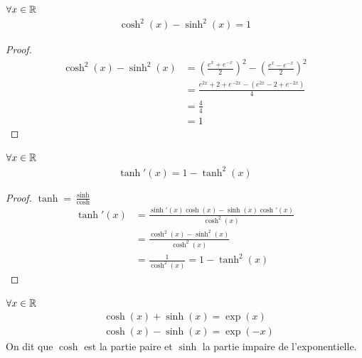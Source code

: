 \begin{graybox}
	\begin{proposition}[]
		$\forall x \in \mathbb{R}$
		\begin{align*}
			\cosh^2(x) - \sinh^2(x) = 1
		\end{align*}
	\end{proposition}
\end{graybox}

\begin{proof}
	\begin{align*}
		\cosh^2(x) - \sinh^2(x) &= \left( \frac{e^x + e^{-x}}{2} \right)^2 - \left( \frac{ e^x - e^{-x} }{ 2 } \right)^2 \\
		&= \frac{e^{2x} + 2 + e^{-2x} - (e^{2x} - 2 + e^{-2x})}{4} \\
		&= \frac{4}{4} \\
		&= 1
	\end{align*}
\end{proof}

\begin{graybox}
	\begin{proposition}[]
		$\forall x \in \mathbb{R}$
		\begin{align*}
			\tanh'(x) = 1 - \tanh^2(x)
		\end{align*}
	\end{proposition}
\end{graybox}

\begin{proof}
	$\tanh = \frac{\sinh}{\cosh}$
	\begin{align*}
		\tanh'(x) &= \frac{\sinh'(x)\cosh(x) - \sinh(x)\cosh'(x)}{\cosh^2(x)} \\
		&= \frac{\cosh^2(x) - \sinh^2(x)}{\cosh^2(x)} \\
		&= \frac{1}{\cosh^2(x)} = 1 - \tanh^2(x)
	\end{align*}
\end{proof}

\begin{graybox}
	\begin{proposition}[]
		$\forall x \in \mathbb{R}$ 
		\begin{align*}
			&\cosh{(x)} + \sinh{(x)} = \exp{(x)} \\
			&\cosh{(x)} - \sinh{(x)} = \exp{(-x)}
		\end{align*}
		On dit que $\cosh$ est la partie paire et $\sinh$ la partie impaire de l'exponentielle.
	\end{proposition}
\end{graybox}

